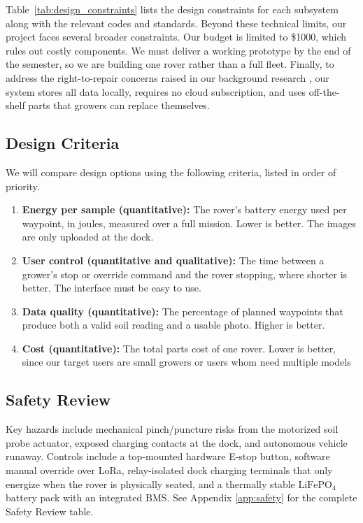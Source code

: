 \documentclass[12pt, letterpaper]{article}
\begin{document}
Table~\ref{tab:design_constraints} lists the design constraints for each subsystem along with the relevant codes and standards. Beyond these technical limits, our project faces several broader constraints. Our budget is limited to \$1000, which rules out costly components. We must deliver a working prototype by the end of the semester, so we are building one rover rather than a full fleet. Finally, to address the right-to-repair concerns raised in our background research \cite{pirg2023}, our system stores all data locally, requires no cloud subscription, and uses off-the-shelf parts that growers can replace themselves.

\subsection{Design Criteria}
We will compare design options using the following criteria, listed in order of priority.

\begin{enumerate}
    \item \textbf{Energy per sample (quantitative):} The rover's battery energy used per waypoint, in joules, measured over a full mission. Lower is better. The images are only uploaded at the dock.
    \item \textbf{User control (quantitative and qualitative):} The time between a grower's stop or override command and the rover stopping, where shorter is better. The interface must be easy to use.
    \item \textbf{Data quality (quantitative):} The percentage of planned waypoints that produce both a valid soil reading and a usable photo. Higher is better.
    \item \textbf{Cost (quantitative):} The total parts cost of one rover. Lower is better, since our target users are small growers or users whom need multiple models
\end{enumerate}

\subsection{Safety Review}
Key hazards include mechanical pinch/puncture risks from the motorized soil probe actuator, exposed charging contacts at the dock, and autonomous vehicle runaway. Controls include a top-mounted hardware E-stop button, software manual override over LoRa, relay-isolated dock charging terminals that only energize when the rover is physically seated, and a thermally stable $\text{LiFePO}_4$ battery pack with an integrated BMS. See Appendix \ref{app:safety} for the complete Safety Review table.
\end{document}
